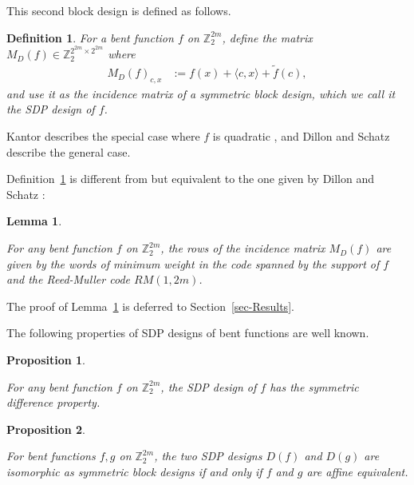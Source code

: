 \documentclass[12pt,a4paper]{article}
\newcommand{\mb}[1]{\mathbb{#1}}
\newcommand{\Z}{\mb{Z}}
\newcommand{\dual}[1]{\widetilde{#1}}
\newtheorem{Lemma}{Lemma}
\newtheorem{Proposition}{Proposition}
\newtheorem{Definition}{Definition}
\begin{document}
This second block design is defined as follows.
\begin{Definition}
\label{def-SDP-design}
For a bent function  $f$ on $\Z_2^{2m}$, define the matrix $M_D(f) \in \Z_2^{2^{2m} \times 2^{2m}}$ where
\begin{align}
M_D(f)_{c,x} &:= f(x) + \langle c, x \rangle + \dual{f}(c),
\label{D-f-def}
\end{align}
and use it as the incidence matrix of a symmetric block design, which
we call it the \emph{SDP design} of $f$.
\end{Definition}

Kantor describes the special case where $f$ is quadratic
\cite[Section 5]{Kan75symplectic},
and Dillon and Schatz \cite{DilS87block} describe the general case.

Definition~\ref{def-SDP-design} is different from but equivalent to the one given by Dillon and Schatz \cite[p. 160]{DilS87block}:
\begin{Lemma}
\label{lm-SDP-design-rows}
\cite[3.29]{Neu06bent}

For any bent function $f$ on $\Z_2^{2m}$, the rows of the incidence matrix $M_D(f)$
are given by the words of minimum weight in the code spanned by the support of $f$ and the Reed-Muller code $RM(1,2m)$.
\end{Lemma}
The proof of Lemma~\ref{lm-SDP-design-rows} is deferred to Section~\ref{sec-Results}.

The following properties of SDP designs of bent functions are well known.
\begin{Proposition}
\label{prop-SDP-design}
\cite[p. 160]{DilS87block} \cite[Theorem 3.29]{Neu06bent}

For any bent function $f$ on $\Z_2^{2m}$, the SDP design of $f$ has the symmetric difference property.
\end{Proposition}

\begin{Proposition}
\label{prop-SDP-design-affine-equivalence}
\cite[p. 161]{DilS87block} \cite{Kan83exponential}

For bent functions $f, g$ on $\Z_2^{2m}$,
the two SDP designs $D(f)$ and $D(g)$ are isomorphic as symmetric block designs if and only if $f$ and $g$ are affine equivalent.
\end{Proposition}

%
%

\end{document}
